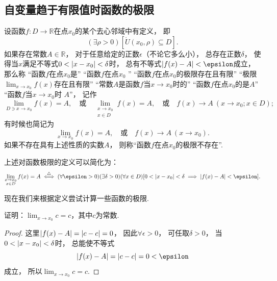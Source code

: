 \subsection{自变量趋于有限值时函数的极限}
\begin{definition}\label{definition:极限.函数极限的定义1}
设函数\(f\colon D\to\mathbb{R}\)在点\(x_0\)的某个去心邻域中有定义，
即\begin{equation*}
	(\exists\rho>0)
	[\mathring{U}(x_0,\rho) \subseteq D].
\end{equation*}
如果存在常数\(A\in\mathbb{R}\)，
对于任意给定的正数\(\epsilon\)（不论它多么小），
总存在正数\(\delta\)，
使得当\(x\)满足不等式\(0 < \abs{x-x_0} < \delta\)时，
总有不等式\(\abs{f(x)-A}<\epsilon\)成立，
那么称
“函数\(f\)在点\(x_0\)是”
“函数\(f\)在点\(x_0\) ”
“函数\(f\)在点\(x_0\)的极限存在且有限”
“极限\(\lim_{x \to x_0} f(x)\)存在且有限”
“常数\(A\)是函数\(f\)当\(x \to x_0\)时的”
“函数\(f\)在点\(x_0\)的是\(A\)”
“函数\(f\)当\(x \to x_0\)时 \(A\)”，
记作\begin{equation*}
	\lim_{D \ni x \to x_0} f(x) = A,
	\quad\text{或}\quad
	\lim_{\substack{x \to x_0 \\ x \in D}} f(x) = A,
	\quad\text{或}\quad
	f(x) \to A\ (x \to x_0; x \in D);
\end{equation*}
有时候也简记为\begin{equation*}
	\lim_{x \to x_0} f(x) = A,
	\quad\text{或}\quad
	f(x) \to A\ (x \to x_0).
\end{equation*}
如果不存在具有上述性质的实数\(A\)，
则称“函数\(f\)在点\(x_0\)的极限不存在”.
\end{definition}

上述对函数极限的定义可以简化为：\begin{equation*}
	\lim_{\substack{x \to x_0 \\ x \in D}} f(x) = A
	\defiff
	(\forall \epsilon > 0)
	(\exists \delta > 0)
	(\forall x \in D)
	[0 < \abs{x - x_0} < \delta \implies \abs{f(x) - A} < \epsilon].
\end{equation*}

现在我们来根据定义尝试计算一些函数的极限.

\begin{example}
证明：\(\lim_{x \to x_0} c = c\)，其中\(c\)为常数.
\begin{proof}
这里\(\abs{f(x) - A} = \abs{c - c} = 0\)，
因此\(\forall \epsilon > 0\)，
可任取\(\delta > 0\)，
当\(0 < \abs{x - x_0} < \delta\)时，
总能使不等式\begin{equation*}
	\abs{f(x) - A} = \abs{c - c} = 0 < \epsilon
\end{equation*}成立，
所以\(\lim_{x \to x_0} c = c\).
\end{proof}
\end{example}

